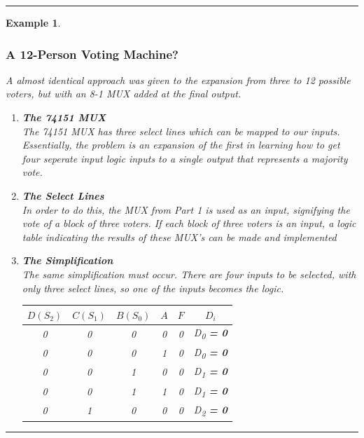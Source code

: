 \documentclass[12pt]{article}
\newtheorem{example}{Example}
\newenvironment{examp}
{
	\vspace{.5cm}
	\hrule
\begin{example}\upshape}
	{\hrule
		\vspace{0.5cm}
\end{example}}
\begin{document}
\begin{examp}
	\subsubsection*{A 12-Person Voting Machine?}
	A almost identical approach was given to the expansion from three to 12 possible
	voters, but with an 8-1 MUX added at the final output.
	\begin{enumerate}
		\item \textbf{The 74151 MUX}\\
		      The 74151 MUX has \textit{three} select lines which can be mapped to our
		      inputs.
		      Essentially, the problem is an expansion of the first in learning how to
		      get four seperate input logic inputs to a single output that represents a
		      majority vote.
		\item \textbf{The Select Lines}\\
		      In order to do this, the MUX from Part 1 is used as an input, signifying
		      the vote of a block of three voters.
		      If each block of three voters is an input, a logic table indicating the
		      results of these MUX's can be made and implemented
		\item \textbf{The Simplification}\\
		      The same simplification must occur. There are four inputs to be selected,
		      with only three select lines, so one of the inputs becomes the logic.
		      \begin{table}[H]
			      \centering
			      \begin{tabular}{|c|c|c|c|c|c|}
				      \hline
				      \(D (S_2)\)             & \(C (S_1)\) & \(B (S_0)\) & \(A\) & \(F\) & \(D_i\)                         \\
				      \hline
				      \rowcolor[gray]{.9} 0   & 0           & 0           & 0     & 0     & D\textsubscript{0} \textbf{= 0} \\
				      \rowcolor[gray]{.9}		0  & 0           & 0           & 1     & 0     & D\textsubscript{0} \textbf{= 0} \\
				      0                       & 0           & 1           & 0     & 0     & D\textsubscript{1} \textbf{= 0} \\
				      \rowcolor[gray]{.9} 0   & 0           & 1           & 1     & 0     & D\textsubscript{1} \textbf{= 0} \\
				      \rowcolor[gray]{.9} 		0 & 1           & 0           & 0     & 0     & D\textsubscript{2} \textbf{= 0} \\

\end{tabular}
\end{table}
\end{enumerate}
\end{examp}
\end{document}
